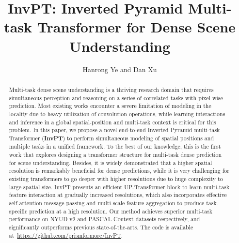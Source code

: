 \documentclass[runningheads]{llncs}
\begin{document}
\pagestyle{headings}
\mainmatter

\def\PAPERTITLE{InvPT: Inverted Pyramid Multi-task Transformer for Dense Scene Understanding}
\title{\PAPERTITLE} 




\author{
Hanrong Ye and Dan Xu\textsuperscript{\Letter}
}
\maketitle
\vspace{-15PT}
\begin{abstract}
Multi-task dense scene understanding is a thriving research domain that requires simultaneous perception and reasoning on a series of correlated tasks with pixel-wise prediction. Most existing works encounter a severe limitation of modeling in the locality due to heavy utilization of convolution operations, while learning interactions and inference in a global spatial-position and multi-task context is critical for this problem.
In this paper, we propose a novel end-to-end Inverted Pyramid multi-task Transformer (\textbf{InvPT}) to perform simultaneous modeling of spatial positions and multiple tasks in a unified framework. To the best of our knowledge, this is the first work that explores designing a transformer structure for multi-task dense prediction for scene understanding. Besides, it is widely demonstrated that a higher spatial resolution is remarkably beneficial for dense predictions, while it is very challenging for existing transformers to go deeper with higher resolutions due to huge complexity to large spatial size.
InvPT presents an efficient UP-Transformer block to learn multi-task feature interaction at gradually increased resolutions, which also incorporates effective self-attention message passing and multi-scale feature aggregation to produce task-specific prediction at a high resolution.
Our method achieves superior multi-task performance on NYUD-v2 and PASCAL-Context datasets respectively, and significantly outperforms previous state-of-the-arts. The code is available at~\url{https://github.com/prismformore/InvPT}.
\end{abstract}
\end{document}
